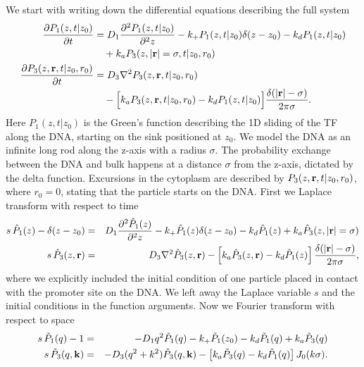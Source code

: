 We start with writing down the differential equations describing the full system
\setlength{\jot}{12pt}
\begin{equation}
\elabel{DE_full}
\begin{split}
\pdiff{P_{1}(z,t|z_0)}{t} & = D_1 \frac{\partial^2 P_{1}(z,t|z_0)}{\partial^2 z} - k_+ P_{1}(z,t|z_0) \delta(z - z_0) - k_d P_{1}(z,t|z_0) \\
 & \quad  + k_a P_{3}(z, |{\bf r}| = \sigma, t|z_0, r_0) \\
\pdiff{P_{3}(z,{\bf r},t|z_0,r_0)}{t} & = D_3 \nabla^2 P_{3}(z, {\bf r}, t|z_0,r_0) \\
 & \quad - \Big[ k_a P_{3}(z, {\bf r}, t|z_0,r_0) - k_d P_{1}(z,t|z_0) \Big] \frac{\delta(|{\bf r}| - \sigma)}{2 \pi \sigma}.
\end{split}
\end{equation}
Here $P_1(z, t|z_0)$ is the Green's function describing the 1D sliding of the TF along the DNA, starting on the sink positioned at $z_0$. We model the DNA as an infinite long rod along the z-axis with a radius $\sigma$. The probability exchange between the DNA and bulk happens at a distance $\sigma$ from the z-axis, dictated by the delta function. Excursions in the cytoplasm are described by $P_3(z, {\bf r}, t|z_0,r_0)$, where $r_0=0$, stating that the particle starts on the DNA. First we Laplace transform with respect to time
\begin{eqnarray*}
 s \, \hat{P}_{1}(z) - \delta(z - z_0) & = & D_1 \frac{\partial^2\hat{P}_1(z)}{\partial^2 z}  - k_+ \hat{P}_1(z) \delta(z - z_0) - k_d \hat{P}_1(z) + k_a \hat{P}_3(z, |{\bf r}| = \sigma) \\
 s \, \hat{P}_3(z,{\mathbf r}) & = & D_3 \nabla^2 \hat{P}_3(z, {\bf r}) - \left[ k_a \hat{P}_3(z,{\bf r}) - k_d \hat{P}_1(z) \right] \frac{\delta(|{\bf r}| - \sigma)}{2 \pi \sigma},
\end{eqnarray*}
where we explicitly included the initial condition of one particle placed in contact with the promoter site on the DNA. We left away the Laplace variable $s$ and the initial conditions in the function arguments. Now we Fourier transform with respect to space
\begin{eqnarray}
 s \, \tilde{P}_1(q) - 1 & = & - D_1 q^2 \tilde{P}_1(q) - k_+ \tilde{P}_1(z_0) - k_d \tilde{P}_1(q) + k_a \tilde{P}_3(q) \elabel{FDE_dna} \\
 s \, \tilde{P}_3(q,{\bf k}) & = & - D_3 (q^2 + k^2) \tilde{P}_3(q, {\bf k}) - \left[ k_a \tilde{P}_3(q) - k_d \tilde{P}_1(q) \right] J_{0}(k \sigma). 
 \elabel{FDE_bulk}
\end{eqnarray}
